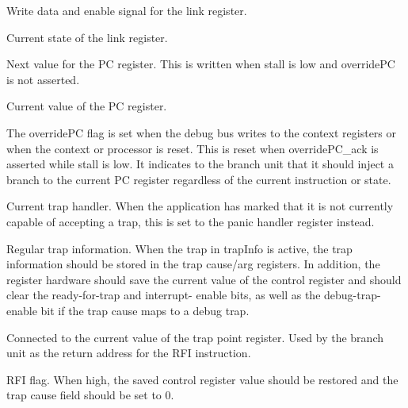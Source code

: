 \ifaceSubGroup{}
Write data and enable signal for the link register.
    
\ifaceSubGroup{}
Current state of the link register.

\ifaceSubGroup{}
Next value for the PC register. This is written when stall is low and overridePC 
is not asserted.

\ifaceSubGroup{}
Current value of the PC register.

\ifaceSubGroup{}
The overridePC flag is set when the debug bus writes to the context registers or 
when the context or processor is reset. This is reset when overridePC_ack is 
asserted while stall is low. It indicates to the branch unit that it should 
inject a branch to the current PC register regardless of the current instruction 
or state.

\ifaceSubGroup{}
Current trap handler. When the application has marked that it is not currently 
capable of accepting a trap, this is set to the panic handler register instead.

\ifaceSubGroup{}
Regular trap information. When the trap in trapInfo is active, the trap 
information should be stored in the trap cause/arg registers. In addition, the 
register hardware should save the current value of the control register and 
should clear the ready-for-trap and interrupt- enable bits, as well as the 
debug-trap-enable bit if the trap cause maps to a debug trap.

\ifaceSubGroup{}
Connected to the current value of the trap point register. Used by the branch 
unit as the return address for the RFI instruction.

\ifaceSubGroup{}
RFI flag. When high, the saved control register value should be restored and the 
trap cause field should be set to 0.

